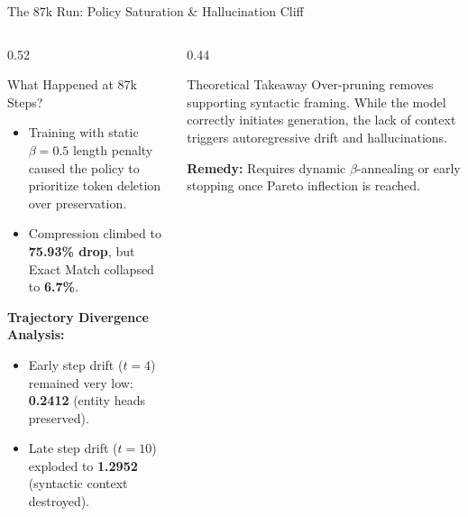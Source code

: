 \documentclass[aspectratio=169,10pt]{beamer}
\begin{document}
\begin{frame}{The 87k Run: Policy Saturation \& Hallucination Cliff}
  \begin{columns}[T]
    \begin{column}{0.52\textwidth}
      \begin{block}{What Happened at 87k Steps?}
        \begin{itemize}
          \item Training with static $\beta = 0.5$ length penalty caused the policy to prioritize token deletion over preservation.
          \item Compression climbed to \textbf{75.93\% drop}, but Exact Match collapsed to \textbf{6.7\%}.
        \end{itemize}
      \end{block}
      \textbf{Trajectory Divergence Analysis:}
      \begin{itemize}
        \item Early step drift ($t=4$) remained very low: \textbf{0.2412} (entity heads preserved).
        \item Late step drift ($t=10$) exploded to \textbf{1.2952} (syntactic context destroyed).
      \end{itemize}
    \end{column}
    \begin{column}{0.44\textwidth}
      \begin{alertblock}{Theoretical Takeaway}
        Over-pruning removes supporting syntactic framing. While the model correctly initiates generation, the lack of context triggers autoregressive drift and hallucinations.
      \end{alertblock}
      \vspace{0.2cm}
      \textbf{Remedy:} Requires dynamic $\beta$-annealing or early stopping once Pareto inflection is reached.
    \end{column}
  \end{columns}
\end{frame}
\end{document}

